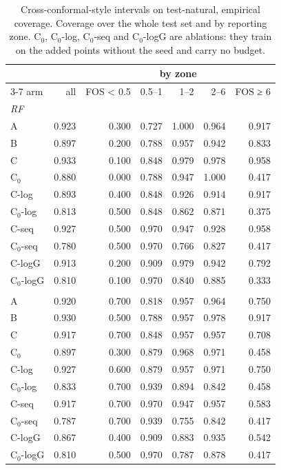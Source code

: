 \begin{table}[htbp]
\centering
\caption{Cross-conformal-style intervals on test-natural, empirical coverage. Coverage over the whole test set and by reporting zone. C$_0$, C$_0$-log, C$_0$-seq and C$_0$-logG are ablations: they train on the added points without the seed and carry no budget.}
\label{tab:test-natural__log-rmse:conformal}
\begin{tabular}{lrrrrrr}
\toprule
 &  & \multicolumn{5}{c}{by zone} \\
\cmidrule(lr){3-7}
arm & all & FOS < 0.5 & 0.5–1 & 1–2 & 2–6 & FOS ≥ 6 \\
\midrule
\multicolumn{7}{l}{\textit{RF}} \\
A & 0.923 & 0.300 & 0.727 & 1.000 & 0.964 & 0.917 \\
B & 0.897 & 0.200 & 0.788 & 0.957 & 0.942 & 0.833 \\
C & 0.933 & 0.100 & 0.848 & 0.979 & 0.978 & 0.958 \\
C$_0$ & 0.880 & 0.000 & 0.788 & 0.947 & 1.000 & 0.417 \\
C-log & 0.893 & 0.400 & 0.848 & 0.926 & 0.914 & 0.917 \\
C$_0$-log & 0.813 & 0.500 & 0.848 & 0.862 & 0.871 & 0.375 \\
C-seq & 0.927 & 0.500 & 0.970 & 0.947 & 0.928 & 0.958 \\
C$_0$-seq & 0.780 & 0.500 & 0.970 & 0.766 & 0.827 & 0.417 \\
C-logG & 0.913 & 0.200 & 0.909 & 0.979 & 0.942 & 0.792 \\
C$_0$-logG & 0.810 & 0.100 & 0.970 & 0.840 & 0.885 & 0.333 \\
\addlinespace
\multicolumn{7}{l}{\textit{GBM}} \\
A & 0.920 & 0.700 & 0.818 & 0.957 & 0.964 & 0.750 \\
B & 0.930 & 0.500 & 0.788 & 0.957 & 0.978 & 0.917 \\
C & 0.917 & 0.700 & 0.848 & 0.957 & 0.957 & 0.708 \\
C$_0$ & 0.897 & 0.300 & 0.879 & 0.968 & 0.971 & 0.458 \\
C-log & 0.927 & 0.600 & 0.879 & 0.957 & 0.971 & 0.750 \\
C$_0$-log & 0.833 & 0.700 & 0.939 & 0.894 & 0.842 & 0.458 \\
C-seq & 0.917 & 0.700 & 0.970 & 0.947 & 0.957 & 0.583 \\
C$_0$-seq & 0.787 & 0.700 & 0.939 & 0.755 & 0.842 & 0.417 \\
C-logG & 0.867 & 0.400 & 0.909 & 0.883 & 0.935 & 0.542 \\
C$_0$-logG & 0.810 & 0.500 & 0.970 & 0.787 & 0.878 & 0.417 \\
\bottomrule
\end{tabular}
\end{table}
